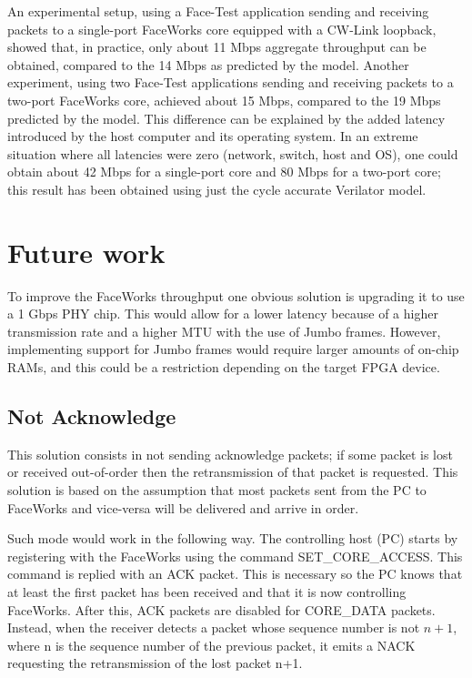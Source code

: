 \documentclass[defaultstyle,10pt,master,Helvetica]{thesis}
\begin{document}
An experimental setup, using a Face-Test application sending and receiving packets to a single-port FaceWorks core equipped with a CW-Link loopback, showed that, in practice, only about 11 Mbps aggregate throughput can be obtained, compared to the 14 Mbps as predicted by the model. Another experiment, using two Face-Test applications sending and receiving packets to a two-port FaceWorks core, achieved about 15 Mbps, compared to the 19 Mbps predicted by the model. This difference can be explained by the added latency introduced by the host computer and its operating system. In an extreme situation where all latencies were zero (network, switch, host and OS), one could obtain about 42 Mbps for a single-port core and 80 Mbps for a two-port core; this result has been obtained using just the cycle accurate Verilator model.


\section{Future work}

To improve the FaceWorks throughput one obvious solution is upgrading it to use a 1 Gbps PHY chip. This would allow for a lower latency because of a higher transmission rate and a higher \ac{MTU} with the use of Jumbo frames. However, implementing support for Jumbo frames would require larger amounts of on-chip \acsp{RAM}, and this could be a restriction depending on the target \ac{FPGA} device.



\subsection{Not Acknowledge}

This solution consists in not sending acknowledge packets; if some packet is lost or received out-of-order then the retransmission of that packet is requested. This solution is based on the assumption that most packets sent from the PC to FaceWorks and vice-versa will be delivered and arrive in order.

Such mode would work in the following way. The controlling host (PC) starts by registering with the FaceWorks using the command SET\_CORE\_ACCESS. This command is replied with an \ac{ACK} packet. This is necessary so the PC knows that at least the first packet has been received and that it is now controlling FaceWorks. After this, \ac{ACK} packets are disabled for CORE\_DATA packets. Instead, when the receiver detects a packet whose sequence number is not $n+1$, where n is the sequence number of the previous packet, it emits a \ac{NACK} requesting the retransmission of the lost packet n+1.
\end{document}
